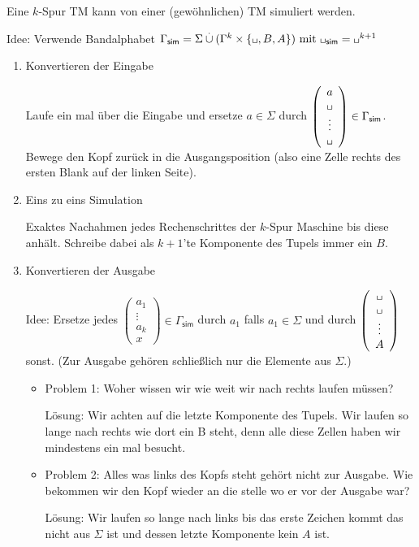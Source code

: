 \begin{Bemerkung}
Eine $k$-Spur \ac{TM} kann von einer (gewöhnlichen) \ac{TM} simuliert werden.

\medskip

Idee: Verwende Bandalphabet $\Gamma_\mathsf{sim} = \Sigma \overset{.}{\cup} (\Gamma^k\times\{\blank, B, A\})\text{ mit } \blank_\mathsf{sim}=\blank^{k+1}$

\begin{enumerate}
 \item Konvertieren der Eingabe
 
 Laufe ein mal über die Eingabe und ersetze $a\in\Sigma$ durch $\left(\begin{array}{c}a\\ \mblank\\ \vdots\\ \mblank\end{array}\right)\in\Gamma_\mathsf{sim}$. 
 Bewege den Kopf zurück in die Ausgangsposition (also eine Zelle rechts des ersten Blank auf der linken Seite).
 
 \item Eins zu eins Simulation
 
 Exaktes Nachahmen jedes Rechenschrittes der $k$-Spur Maschine bis diese anhält.
 Schreibe dabei als $k+1$'te Komponente des Tupels immer ein $B$.
 
 \item Konvertieren der Ausgabe
 
 Idee: Ersetze jedes $\left(\begin{array}{c}a_1\\ \vdots\\ a_k\\ x\end{array}\right)\in\Gamma_\mathsf{sim}$ durch $a_1$ falls $a_1\in\Sigma$ und durch 
 $\left(\begin{array}{c}\mblank \\ \mblank\\ \vdots\\ A\end{array}\right)$ sonst.
 (Zur Ausgabe gehören schließlich nur die Elemente aus $\Sigma$.)
 
 \begin{itemize}
  \item Problem 1: Woher wissen wir wie weit wir nach rechts laufen müssen?
  
  Lösung: Wir achten auf die letzte Komponente des Tupels. 
  Wir laufen so lange nach rechts wie dort ein B steht, denn alle diese Zellen haben wir mindestens ein mal besucht.
  
  \item Problem 2: Alles was links des Kopfs steht gehört nicht zur Ausgabe. 
  Wie bekommen wir den Kopf wieder an die stelle wo er vor der Ausgabe war?
  
  Lösung: Wir laufen so lange nach links bis das erste Zeichen kommt das nicht aus $\Sigma$ ist und dessen letzte Komponente kein $A$ ist. 
 \end{itemize}
\end{enumerate}

\end{Bemerkung}


